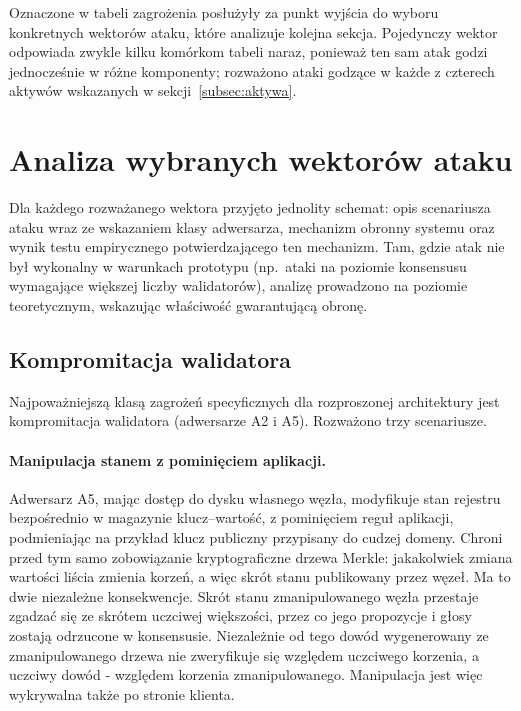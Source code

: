 Oznaczone w tabeli zagrożenia posłużyły za punkt wyjścia do wyboru konkretnych wektorów ataku, które analizuje kolejna sekcja. Pojedynczy wektor odpowiada zwykle kilku komórkom tabeli naraz, ponieważ ten sam atak godzi jednocześnie w różne komponenty; rozważono ataki godzące w każde z czterech aktywów wskazanych w sekcji~\ref{subsec:aktywa}.

\section{Analiza wybranych wektorów ataku}
\label{sec:wektory-atakow}

Dla każdego rozważanego wektora przyjęto jednolity schemat: opis scenariusza ataku wraz ze wskazaniem klasy adwersarza, mechanizm obronny systemu oraz wynik testu empirycznego potwierdzającego ten mechanizm. Tam, gdzie atak nie był wykonalny w warunkach prototypu (np.\ ataki na poziomie konsensusu wymagające większej liczby walidatorów), analizę prowadzono na poziomie teoretycznym, wskazując właściwość gwarantującą obronę.

\subsection{Kompromitacja walidatora}
\label{subsec:kompromitacja-walidatora}

Najpoważniejszą klasą zagrożeń specyficznych dla rozproszonej architektury jest kompromitacja walidatora (adwersarze A2 i A5). Rozważono trzy scenariusze.

\paragraph{Manipulacja stanem z pominięciem aplikacji.} Adwersarz A5, mając dostęp do dysku własnego węzła, modyfikuje stan rejestru bezpośrednio w magazynie klucz--wartość, z pominięciem reguł aplikacji, podmieniając na przykład klucz publiczny przypisany do cudzej domeny. Chroni przed tym samo zobowiązanie kryptograficzne drzewa Merkle: jakakolwiek zmiana wartości liścia zmienia korzeń, a więc skrót stanu publikowany przez węzeł. Ma to dwie niezależne konsekwencje. Skrót stanu zmanipulowanego węzła przestaje zgadzać się ze skrótem uczciwej większości, przez co jego propozycje i głosy zostają odrzucone w konsensusie. Niezależnie od tego dowód wygenerowany ze zmanipulowanego drzewa nie zweryfikuje się względem uczciwego korzenia, a uczciwy dowód - względem korzenia zmanipulowanego. Manipulacja jest więc wykrywalna także po stronie klienta.

